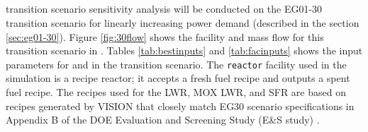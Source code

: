 \subsection{\Cyclus}
\Cyclus transition scenario sensitivity analysis will be conducted 
on the EG01-30 transition 
scenario for linearly increasing power demand (described in 
the section \ref{sec:eg01-30}). 
Figure \ref{fig:30flow} shows the facility and mass flow 
for this transition scenario in \Cyclus. 
Tables \ref{tab:bestinputs} and \ref{tab:facinputs}
shows the input parameters for \deploy and 
in the transition scenario. 
The \texttt{reactor} facility used in the \Cyclus simulation 
is a recipe reactor; it accepts a fresh fuel recipe and outputs 
a spent fuel recipe. 
The recipes used for the \gls{LWR}, \gls{MOX} \gls{LWR}, and 
\gls{SFR} are based on recipes generated by VISION 
\cite{chee_arfc/transition-scenarios_2018}
that closely match EG30 scenario specifications in 
Appendix B of the \gls{DOE} Evaluation and Screening Study 
(E\&S study) \cite{wigeland_nuclear_2014}. 


